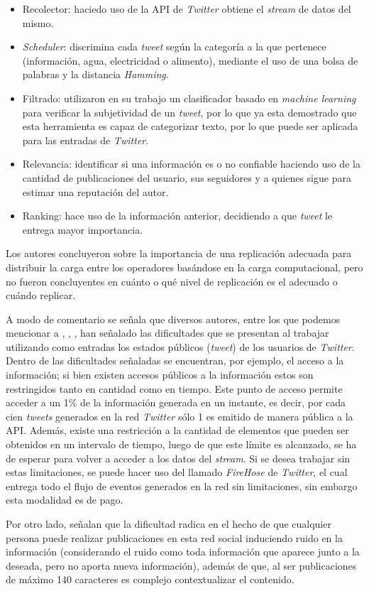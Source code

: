 \begin{itemize}
\item Recolector: haciedo uso de la API de \textit{Twitter} obtiene el \textit{stream} de datos del mismo. 
\item \textit{Scheduler}: discrimina cada \textit{tweet} según la categoría a la que pertenece (información, agua, electricidad o alimento), mediante el uso de una bolsa de palabras y la distancia \textit{Hamming}.
\item Filtrado: utilizaron en su trabajo un clasificador basado en \textit{machine learning} para verificar la subjetividad de un \textit{tweet}, por lo que ya esta demostrado que esta herramienta es capaz de categorizar texto, por lo que puede ser aplicada para las entradas de \textit{Twitter}.
\item Relevancia: identificar si una información es o no confiable haciendo uso de la cantidad de publicaciones del usuario, sus seguidores y a quienes sigue para estimar una reputación del autor.
\item Ranking: hace uso de la información anterior, decidiendo a que \textit{tweet} le entrega mayor importancia.
\end{itemize}

Los autores concluyeron sobre la importancia de una replicación adecuada para distribuir la carga entre los operadores basándose en la carga computacional, pero no fueron concluyentes en cuánto o qué nivel de replicación es el adecuado o cuándo replicar.

A modo de comentario se señala que diversos autores, entre los que podemos mencionar a \cite{VanDeVoort}, \cite{EventDetectionInTwitter}, \cite{Maldonado}, han señalado las dificultades que se presentan al trabajar utilizando como entradas los estados públicos (\textit{tweet}) de los usuarios de \textit{Twitter}. Dentro de las dificultades señaladas se encuentran, por ejemplo, el acceso a la información; si bien existen accesos públicos a la información estos son restringidos tanto en cantidad como en tiempo. Este punto de acceso permite acceder a un 1\% de la información generada en un instante, es decir, por cada cien \textit{tweets} generados en la red \textit{Twitter} sólo 1 es emitido de manera pública a la API. Además, existe una restricción a la cantidad de elementos que pueden ser obtenidos en un intervalo de tiempo, luego de que este límite es alcanzado, se ha de esperar para volver a acceder a los datos del \textit{stream}. Si se desea trabajar sin estas limitaciones, se puede hacer uso del llamado \textit{FireHose} de \textit{Twitter}, el cual entrega todo el flujo de eventos generados en la red sin limitaciones, sin embargo esta modalidad es de pago.

Por otro lado, \cite{VanDeVoort} señalan que la dificultad radica en el hecho de que cualquier persona puede realizar publicaciones en esta red social induciendo ruido en la información (considerando el ruido como toda información que aparece junto a la deseada, pero no aporta nueva información), además de que, al ser publicaciones de máximo 140 caracteres es complejo contextualizar el contenido.
